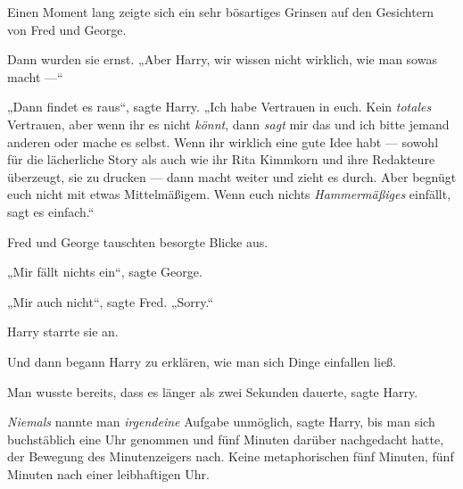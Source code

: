 Einen Moment lang zeigte sich ein sehr bösartiges Grinsen auf den Gesichtern von Fred und George.

Dann wurden sie ernst.
„Aber Harry, wir wissen nicht wirklich, wie man sowas macht —“

„Dann findet es raus“, sagte Harry.
„Ich habe Vertrauen in euch. Kein \emph{totales} Vertrauen, aber wenn ihr es nicht \emph{könnt}, dann \emph{sagt} mir das und ich bitte jemand anderen oder mache es selbst. Wenn ihr wirklich eine gute Idee habt — sowohl für die lächerliche Story als auch wie ihr Rita Kimmkorn und ihre Redakteure überzeugt, sie zu drucken — dann macht weiter und zieht es durch. Aber begnügt euch nicht mit etwas Mittelmäßigem. Wenn euch nichts \emph{Hammermäßiges} einfällt, sagt es einfach.“

Fred und George tauschten besorgte Blicke aus.

„Mir fällt nichts ein“, sagte George.

„Mir auch nicht“, sagte Fred.
„Sorry.“

Harry starrte sie an.

Und dann begann Harry zu erklären, wie man sich Dinge einfallen ließ.

Man wusste bereits, dass es länger als zwei Sekunden dauerte, sagte Harry.

\emph{Niemals} nannte man \emph{irgendeine} Aufgabe unmöglich, sagte Harry, bis man sich buchstäblich eine Uhr genommen und fünf Minuten darüber nachgedacht hatte, der Bewegung des Minutenzeigers nach. Keine metaphorischen fünf Minuten, fünf Minuten nach einer leibhaftigen Uhr.

